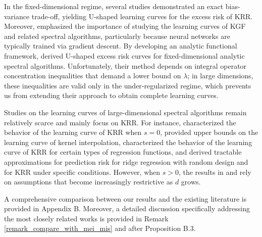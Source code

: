 \documentclass{article}
\theoremstyle{plain}
\theoremstyle{definition}
\theoremstyle{remark}
\newcommand{\dhnote}[1]{{\color{red}[#1]} } %
\begin{document}
In the fixed-dimensional regime, several studies \citep{Bordelon_Spectrum_2020, Cui2021GeneralizationER, jin2021learning, li2023asymptotic, cheng2024comprehensive} demonstrated an exact bias-variance trade-off, yielding U-shaped learning curves for the excess risk of KRR. 
Moreover, \cite{li2024generalization} emphasized the importance of studying the learning curves of KGF and related spectral algorithms, particularly because neural networks are typically trained via gradient descent. By developing an analytic functional framework, \cite{li2024generalization} derived U-shaped excess risk curves for fixed-dimensional analytic spectral algorithms.
Unfortunately, their method depends on integral operator concentration inequalities that demand a lower bound on $\lambda$; in large dimensions, these inequalities are valid only in the under‑regularized regime, which prevents us from extending their approach to obtain complete learning curves.




Studies on the learning curves of large-dimensional spectral algorithms remain relatively scarce and mainly focus on KRR. 
For instance, 
\cite{xiao2022precise, mei2022generalization} characterized the behavior of the learning curve of KRR when $s=0$, 
\cite{barzilai2023generalization} provided upper bounds on the learning curve of kernel interpolation, 
\cite{aerni2023strong} characterized the behavior of the learning curve of KRR for certain types of regression functions,
and \cite{cheng2022dimension, misiakiewicz2024non} derived tractable approximations for prediction risk for ridge regression with random design and for KRR under specific conditions. 
However, when $s>0$, the results in \cite{cheng2022dimension} and \cite{misiakiewicz2024non} rely on assumptions that become increasingly restrictive as $d$ grows.


A comprehensive comparison between our results and the existing literature is provided in Appendix B.
Moreover, a detailed discussion specifically addressing the most closely related works \citep{mei2022generalization, misiakiewicz2024non, zhang2024phase} is provided in Remark \ref{remark_compare_with_mei_mis} and after Proposition B.3.



\end{document}
